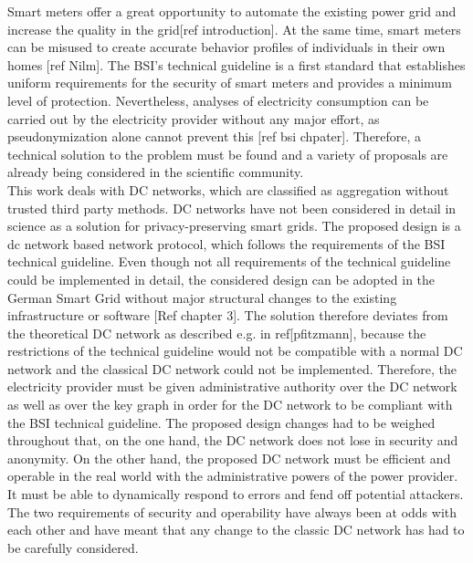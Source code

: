 Smart meters offer a great opportunity to automate the existing power grid and increase the quality in the grid[ref introduction]. At the same time, smart meters can be misused to create accurate behavior profiles of individuals in their own homes [ref Nilm]. The BSI's technical guideline is a first standard that establishes uniform requirements for the security of smart meters and provides a minimum level of protection. Nevertheless, analyses of electricity consumption can be carried out by the electricity provider without any major effort, as pseudonymization alone cannot prevent this [ref bsi chpater]. Therefore, a technical solution to the problem must be found and a variety of proposals are already being considered in the scientific community.\\ This work deals with DC networks, which are classified as aggregation without trusted third party methods. DC networks have not been considered in detail in science as a solution for privacy-preserving smart grids. The proposed design is a dc network based network protocol, which follows the requirements of the BSI technical guideline. Even though not all requirements of the technical guideline could be implemented in detail, the considered design can be adopted in the German Smart Grid without major structural changes to the existing infrastructure or software [Ref chapter 3]. The solution therefore deviates from the theoretical DC network as described e.g. in ref[pfitzmann], because the restrictions of the technical guideline would not be compatible with a normal DC network and the classical DC network could not be implemented. Therefore, the electricity provider must be given administrative authority over the DC network as well as over the key graph in order for the DC network to be compliant with the BSI technical guideline. The proposed design changes had to be weighed throughout that, on the one hand, the DC network does not lose in security and anonymity. On the other hand, the proposed DC network must be efficient and operable in the real world with the administrative powers of the power provider. It must be able to dynamically respond to errors and fend off potential attackers. The two requirements of security and operability have always been at odds with each other and have meant that any change to the classic DC network has had to be carefully considered. \\
